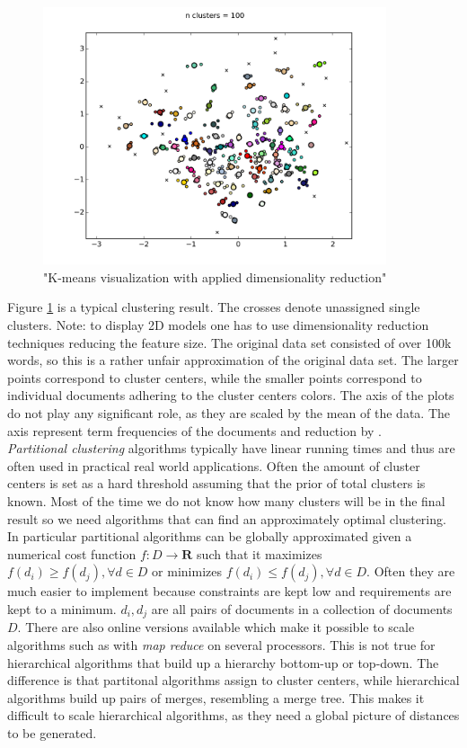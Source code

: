     \begin{figure}[h!]
      \centering
        \includegraphics[width=0.9\textwidth]{kmeans_clustering.png}
        \caption{"K-means visualization with applied dimensionality reduction"}
        \label{kmeans_clustering}
    \end{figure}

    Figure \ref{kmeans_clustering} is a typical clustering result. The crosses denote unassigned single clusters. Note: to display 2D models one has to use dimensionality reduction techniques reducing the feature size. The original data set consisted of over 100k words, so this is a rather unfair approximation of the original data set. The larger points correspond to cluster centers, while the smaller points correspond to individual documents adhering to the cluster centers colors. The axis of the plots do not play any significant role, as they are scaled by the mean of the data. The axis represent term frequencies of the documents and reduction by \pca{}.\\

    \emph{Partitional clustering} algorithms typically have linear running times and thus are often used in practical real world applications. Often the amount of cluster centers is set as a hard threshold assuming that the prior of total clusters is known. Most of the time we do not know how many clusters will be in the final result so we need algorithms that can find an approximately optimal clustering. In particular partitional algorithms can be globally approximated given a numerical cost function $f:D \to \mathbf{R}$ such that it maximizes $f(d_i) \geq f(d_j), \forall d \in D$  or minimizes $f(d_i) \leq f(d_j), \forall d \in D$. Often they are much easier to implement because constraints are kept low and requirements are kept to a minimum. $d_i,d_j$ are all pairs of documents in a collection of documents $D$. There are also online versions available which make it possible to scale algorithms such as \kmeans{} with \emph{map reduce} on several processors. This is not true for hierarchical algorithms that build up a hierarchy bottom-up or top-down. The difference is that partitonal algorithms assign to cluster centers, while hierarchical algorithms build up pairs of merges, resembling a merge tree. This makes it difficult to scale hierarchical algorithms, as they need a global picture of distances to be generated.

